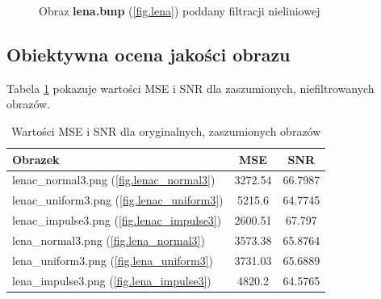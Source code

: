 \documentclass{classrep}
\begin{document}
\begin{figure}
{  \label{fig.lena_rosenfeld_5}
 }
\caption{Obraz \textbf{lena.bmp} (\ref{fig.lena}) poddany filtracji nieliniowej}
\label{fig.lena_rosenfeld}
\end{figure}

\subsection{Obiektywna ocena jakości obrazu}
Tabela \ref{tab.lena_noised} pokazuje wartości MSE i SNR dla zaszumionych, niefiltrowanych obrazów.

\begin{table}
  \centering
  \begin{tabular}{|l|c|c|}
    \hline
    \textbf{Obrazek} & \textbf{MSE} & \textbf{SNR} \\
    \hline\hline
    lenac\_normal3.png (\ref{fig.lenac_normal3}) & 3272.54 & 66.7987 \\ 
    \hline 
    lenac\_uniform3.png (\ref{fig.lenac_uniform3}) & 5215.6 & 64.7745 \\ 
    \hline 
    lenac\_impulse3.png (\ref{fig.lenac_impulse3}) & 2600.51 & 67.797 \\ 
    \hline 
    lena\_normal3.png (\ref{fig.lena_normal3}) & 3573.38 & 65.8764 \\ 
    \hline 
    lena\_uniform3.png (\ref{fig.lena_uniform3}) & 3731.03 & 65.6889 \\ 
    \hline 
    lena\_impulse3.png (\ref{fig.lena_impulse3}) & 4820.2 & 64.5765 \\ 
    \hline 
  \end{tabular}
  \caption{Wartości MSE i SNR dla oryginalnych, zaszumionych obrazów}
  \label{tab.lena_noised}
\end{table}
\end{document}
